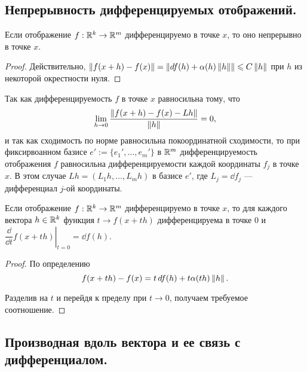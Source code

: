 \documentclass[a4paper]{article}
\theoremstyle{named}
\begin{document}
    \subsection{Непрерывность дифференцируемых отображений.}

    \begin{consequence*}
        Если отображение $f: \mathbb{R}^k \to \mathbb{R}^m$ дифференцируемо в точке $x$, то оно непрерывно в точке $x$.
    \end{consequence*}

    \begin{proof}
        Действительно, $\left\lVert f(x + h) - f(x)\right\rVert = \left\lVert\mathop{}\!d f(h) + \alpha(h)\left\lVert h\right\rVert\right\rVert \leqslant C\left\lVert h\right\rVert$ при $h$ из некоторой окрестности нуля.
    \end{proof}

    \begin{remark*}
        Так как дифференцируемость $f$ в точке $x$ равносильна тому, что
        \begin{equation*}
            \lim_{h \to 0} \dfrac{\left\lVert f(x + h) - f(x) - Lh\right\rVert}{\left\lVert h\right\rVert} = 0,
        \end{equation*}
        и так как сходимость по норме равносильна покоординатной сходимости, то при фиксирвоанном базисе $e' := \{e_1', \dots, e_m'\}$ в $\mathbb{R}^m$ дифференцируемость отображения $f$ равносильна дифференцируемости каждой координаты $f_j$ в точке $x$. В этом случае $Lh = (L_1h, \dots, L_mh)$ в базисе $e'$, где $L_j = \dd f_j$ --- дифференциал $j$-ой координаты.
    \end{remark*}

    \begin{lemma*}
        Если отображение $f: \mathbb{R}^k \to \mathbb{R}^m$ дифференцируемо в точке $x$, то для каждого вектора $h \in \mathbb{R}^k$ функция $t \to f(x + th)$ дифференцируема в точке $0$ и $\left.\dfrac{\dd}{\dd t}f(x + th)\right|_{t = 0} = \dd f(h)$.
    \end{lemma*}

    \begin{proof}
        По определению 
        \begin{equation*}
            f(x + th) - f(x) = t \mathop{}\!d f(h) + t \alpha(th)\left\lVert h\right\rVert.
        \end{equation*}

        Разделив на $t$ и перейдя к пределу при $t \to 0$, получаем требуемое соотношение.
    \end{proof}

    \subsection{Производная вдоль вектора и ее связь с дифференциалом.}
\end{document}
